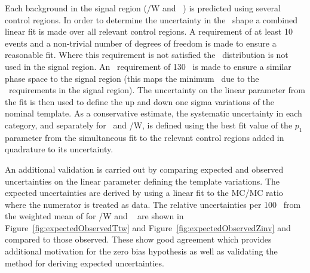 Each background in the signal region (\ttbar/W  and \zInv~) is predicted 
using several control regions. In order to determine the uncertainty in
the \mht~shape a combined linear fit is made over all relevant control regions. 
A requirement of at least 10 events and a non-trivial
number of degrees of freedom is made to ensure a reasonable fit. Where this
requirement is not satisfied the \mht~distribution is not used in the signal region.
An \mht~requirement of 130 \GeV~is made to ensure a similar phase space to 
the signal region (this maps the minimum \mht~due to the \alphat~requirements in the signal region).
The uncertainty on the linear parameter from the fit is then
used to define the up and down one sigma variations of the nominal template.
As a conservative estimate, the systematic uncertainty in each category, and separately
for \zInv~and \ttbar/W, is defined using the best fit value of the $p_1$ parameter 
from the simultaneous fit to the relevant control regions
added in quadrature to its uncertainty.


An additional validation is carried out by comparing expected and observed uncertainties
on the linear parameter defining the template variations.
The expected uncertainties are derived by using a linear fit to the MC/MC ratio where the numerator
is treated as data. The relative uncertainties per 100 \GeV~from the weighted mean of \mht
for \ttbar/W and \zInv~ are shown in Figure~\ref{fig:expectedObservedTtw} 
and Figure~\ref{fig:expectedObservedZinv} and compared to those observed.
These show good agreement which provides additional motivation for the 
zero bias hypothesis as well as validating the method for deriving expected uncertainties.


